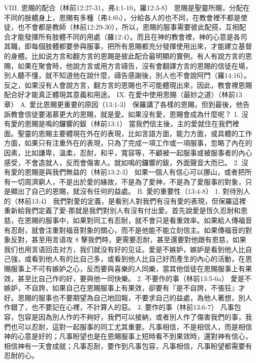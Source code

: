 VIII. 恩賜的配合（林前12:27-31，弗4:1-10，羅12:3-8）
恩賜是聖靈所賜，分配在不同的肢體身上，恩賜有多種（弗4:8b），分給各人的也不同，在教會裡不都是使徒，也不會都是教師（林前12:29-30），所以，恩賜的服事需要彼此配搭，互相配合才能發揮所有肢體不同的用處（羅12:4）。而且在神的教會裡，神的心意是各司其職，即每個肢體都要參與服事，把所有恩賜都充分發揮使用出來，才能建立基督的身體。比如说方言和翻方言的恩賜是彼此配合最明顯的實例，有人有說方言的恩賜，如果在聚會時，他說方言或用方言禱告，沒有會翻譯方言的恩賜的信徒在場，別人聽不懂，就不知道他在說什麼，禱告感謝後，別人也不會說阿門（羅14:16）。反之，如果沒有人會說方言，翻方言的恩賜也不可能體現出來，因此，教會裡恩賜配合好才能真正體現其意義和用途。
IX. 在愛中使用恩賜（最妙之道）（林前13章）
A. 愛比恩賜更重要的原因（13:1-3）
保羅講了各樣的恩賜，但到最後，他告訴教會信徒要渴慕更大的恩賜，就是愛。如果沒有愛，恩賜會成為什麼呢？
1. 沒有愛的恩賜是鳴的鑼響的鈸（林前13:1）
當我們信主後，主的愛就住在我們裡面。聖靈的恩賜主要體現在外在的表現，比如言語方面，能力方面，或具體的工作方面，如果只有注重外在的表現，只為了完成一項工作或一項服事，忽略了內在的因素，比如謙卑，溫柔，忍耐，和平，寬容等，不顧被一起服事或被服事者的內心感受，不會造就人，反而會傷害人。就如鳴的鑼響的鈸，外面聲音大而已。
2. 沒有愛的恩賜是與我們無益的（林前13:2-3）
如果一個人有信心可以挪山，或者把所有一切周濟窮人，不是出於愛的緣故，不是為了愛神，不是為了愛服事的對象，只是顯出了自己的恩賜，就沒有任何的益處。
B. 愛的重要性（13:4-8）
1. 對待別人的（林前13:4）
我們對愛的定義，是看別人對我們有沒有愛的表現，但保羅這裡重新給我們定義了愛-那就是我們對別人有沒有付出愛。首先說愛是恆久忍耐和恩慈，在恩賜的服事中，如果對同工有忍耐，就不會只是看重效率。如果給人傳福音有忍耐，就會注重對福音對象的關心，而不是他能不能立刻信主。如果傳福音的對象反對，甚至用言语攻
8
擊我們時，更需要忍耐，甚至還要對他跟有恩慈，如果我们也用言语回击对方，我们就没有好的见证。愛是不嫉妒，嫉妒是看到他人比自己強，或看到他人有的比自己多，或看到他人比自己好而產生的內心的活動，在恩賜服事上不可有嫉妒之心，反而要與喜樂的人同樂，當其他信徒在恩賜服事上有果效，甚至比自己作的好，要與他一同快樂。
2. 不要作的事（林前13:5-6a）
愛是不嫉妒，不自誇，如果自己在恩賜服事上有果效，卻要有『是不自誇，不張狂』才好。恩賜的服事也不要期望為自己地回報，不要求自己的益處，為他人著想，別人作錯了，也不要記在心裡，不計算人的惡。
3. 要作的事（林前13:6-7）
凡事包容，包容是因為別人作的不夠好，我們可以接納，或者別人作了傷害我們的事，我們也可以忍耐，這對一起服事的同工尤其重要。凡事相信，不是相信人，而是相信神的心意是好的；凡事盼望也是在恩賜服事上短時看不到果效時，還對神有信心，相信神有一天會成就；凡事忍耐，要作到凡事包容，凡事相信，凡事盼望都需要有忍耐的心。
